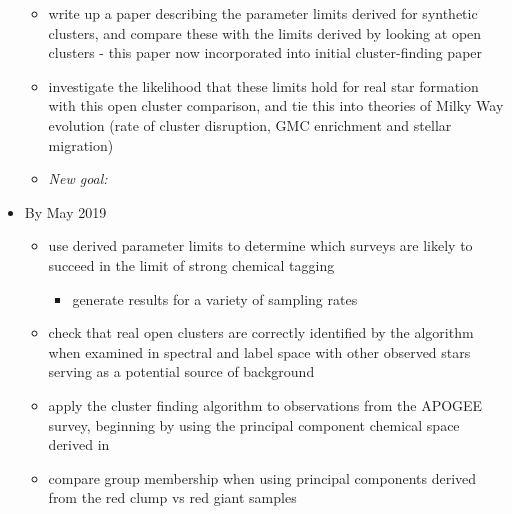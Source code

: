 \documentclass[11pt]{article}
\begin{document}
\begin{itemize}
\begin{itemize}
\item {\color{BurntOrange} write up a paper describing the parameter limits derived for synthetic clusters, and compare these with the limits derived by looking at open clusters} - this paper now incorporated into initial cluster-finding paper
\item investigate the likelihood that these limits hold for real star formation with this open cluster comparison, and tie this into theories of Milky Way evolution (rate of cluster disruption, GMC enrichment and stellar migration)
\item \emph{New goal:}
\end{itemize}
\item By May 2019
\begin{itemize}
\item use derived parameter limits to determine which surveys are likely to succeed in the limit of strong chemical tagging
	\begin{itemize}
		\item {\color{ForestGreen} generate results for a variety of sampling rates}
	\end{itemize}
\item {\color{RoyalBlue} check that real open clusters are correctly identified by the algorithm when examined in spectral and label space with other observed stars serving as a potential source of background}
\item {\color{ForestGreen} apply the cluster finding algorithm to observations from the APOGEE survey, beginning by using the principal component chemical space derived in \citet{Price-Jones2017}}
\item {\color{ForestGreen} compare group membership when using principal components derived from the red clump vs red giant samples}
\end{itemize} 
\end{itemize}
\end{document}

